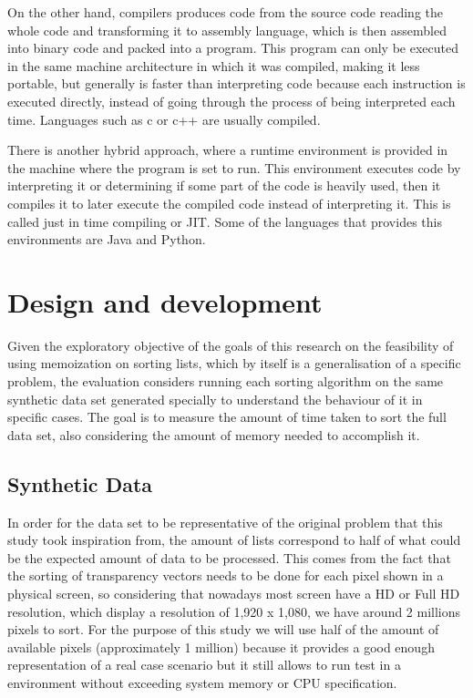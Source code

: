 \documentclass[a4paper,12pt]{article}
\begin{document}
On the other hand, compilers produces code from the source code  reading the whole code and transforming it to assembly language, which is then assembled into binary code and packed into a program. This program can only be executed in the same machine architecture in which it was compiled, making it less portable, but generally is faster than interpreting code because each instruction is executed directly, instead of going through the process of being interpreted each time. Languages such as c or c++ are usually compiled.

There is another hybrid approach, where a runtime environment is provided in the machine where the program is set to run. This environment executes code by interpreting it or determining if some part of the code is heavily used, then it compiles it to later execute the compiled code instead of interpreting it. This is called  just in time compiling or JIT. Some of the languages that provides this environments are Java and Python.

\section{Design and development}
Given the exploratory objective of the goals of this research on the feasibility of using memoization on sorting lists, which by itself is a generalisation of a specific problem, the evaluation considers running each sorting algorithm on the same synthetic data set generated specially to understand the behaviour of it in specific cases. The goal is to measure the amount of time taken to sort the full data set, also considering the amount of memory needed to accomplish it.

\subsection{Synthetic Data}

In order for the data set to be representative of the original problem that this study  took inspiration from, the amount of lists correspond to half of what could be the expected amount of data to be processed. This comes from the fact that the sorting of transparency vectors needs to be done for each pixel shown in a physical screen, so considering that nowadays most screen have a HD or Full HD resolution, which display a resolution of 1,920 x 1,080, we have around 2 millions pixels to sort. For the purpose of this study  we will use half of the amount of available pixels (approximately 1 million) because it provides a good enough representation of a real case scenario but it still allows to run test in a environment without exceeding system memory or CPU specification.
\end{document}
